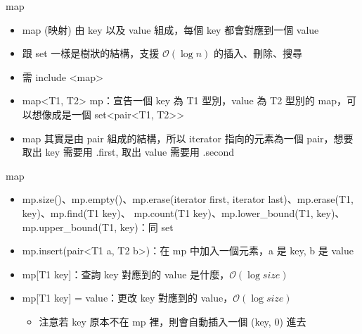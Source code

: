 \documentclass[aspectratio=169]{beamer}
\begin{document}
    \begin{frame}{map}
        \begin{itemize}
            \item<1-> map (映射) 由 key 以及 value 組成，每個 key 都會對應到一個 value
            \item<1-> 跟 set 一樣是樹狀的結構，支援 $\mathcal{O}(\log n)$ 的插入、刪除、搜尋
            \item<1-> 需 include <map>
            \item<2-> map<T1, T2> mp：宣告一個 key 為 T1 型別，value 為 T2 型別的 map，可以想像成是一個 set<pair<T1, T2>> 
            \item<3-> map 其實是由 pair 組成的結構，所以 iterator 指向的元素為一個 pair，想要取出 key 需要用 .first, 取出 value 需要用 .second
        \end{itemize}
    \end{frame}

    \begin{frame}{map}
        \begin{itemize}
            \item<1-> mp.size()、mp.empty()、mp.erase(iterator first, iterator last)、mp.erase(T1, key)、mp.find(T1 key)、
            mp.count(T1 key)、mp.lower\_bound(T1, key)、mp.upper\_bound(T1, key)：同 set
            \item<2-> mp.insert(pair<T1 a, T2 b>)：在 mp 中加入一個元素，a 是 key, b 是 value
            \item<3-> mp[T1 key]：查詢 key 對應到的 value 是什麼，$\mathcal{O}(\log size)$
            \item<3-> mp[T1 key] = value：更改 key 對應到的 value，$\mathcal{O}(\log size)$
                \begin{itemize}
                    \item<4-> 注意若 key 原本不在 mp 裡，則會自動插入一個 (key, 0) 進去
                \end{itemize}
        \end{itemize}
    \end{frame}
\end{document}
